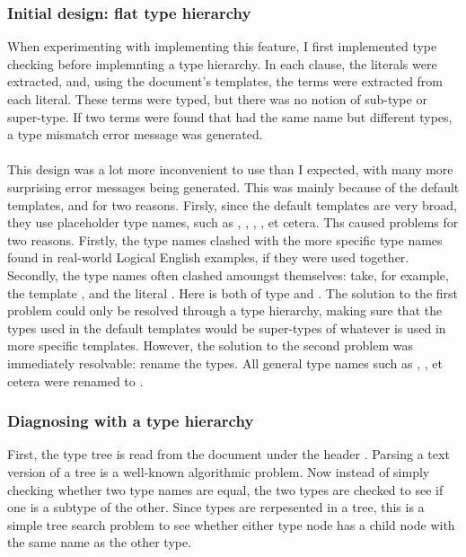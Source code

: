 \documentclass[../main.tex]{subfiles}
\begin{document}
\subsubsection{Initial design: flat type hierarchy}
When experimenting with implementing this feature, I first implemented type checking before implemnting a type hierarchy. In each clause, the literals were extracted, and, using the document's templates, the terms were extracted from each literal. These terms were typed, but there was no notion of sub-type or super-type. If two terms were found that had the same name but different types, a type mismatch error message was generated.
\\ 
\\
This design was a lot more inconvenient to use than I expected, with many more surprising error messages being generated. This was mainly because of the default templates, and for two reasons. Firsly, since the default templates are very broad, they use placeholder type names, such as , , , , et cetera. Ths caused problems for two reasons. Firstly, the type names clashed with the more specific type names found in real-world Logical English examples, if they were used together. Secondly, the type names often clashed amoungst themselves: take, for example, the template , and the literal . Here  is both of type  and .
The solution to the first problem could only be resolved through a type hierarchy, making sure that the types used in the default templates would be super-types of whatever is used in more specific templates. However, the solution to the second problem was immediately resolvable: rename the types. All general type names such as , ,  et cetera were renamed to .

\subsubsection{Diagnosing with a type hierarchy}
First, the type tree is read from the document under the header . Parsing a text version of a tree is a well-known algorithmic problem.
Now instead of simply checking whether two type names are equal, the two types are checked to see if one is a subtype of the other. Since types are rerpesented in a tree, this is a simple tree search problem to see whether either type node has a child node with the same name as the other type.
%
%
%
\end{document}
